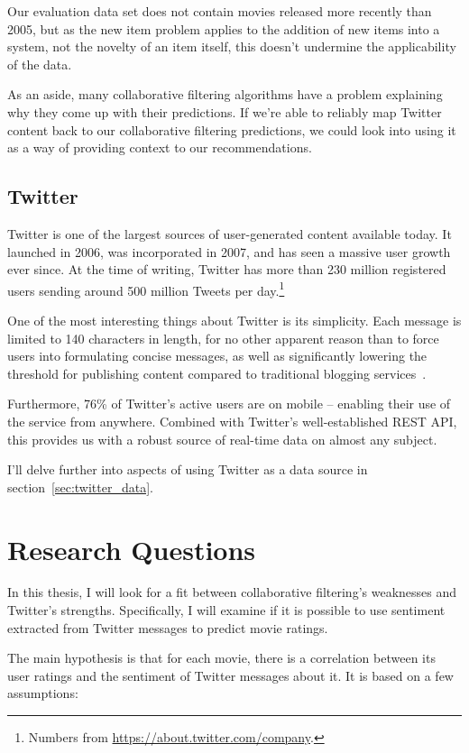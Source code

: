 Our evaluation data set does not contain movies released more recently than 2005, but as the new item problem applies to the addition of new items into a system, not the novelty of an item itself, this doesn't undermine the applicability of the data.

As an aside, many collaborative filtering algorithms have a problem explaining why they come up with their predictions. If we're able to reliably map Twitter content back to our collaborative filtering predictions, we could look into using it as a way of providing context to our recommendations.

\subsection{Twitter}

Twitter is one of the largest sources of user-generated content available today. It launched in 2006, was incorporated in 2007, and has seen a massive user growth ever since. At the time of writing, Twitter has more than 230 million registered users sending around 500 million Tweets per day.\footnote{Numbers from \url{https://about.twitter.com/company}.}

One of the most interesting things about Twitter is its simplicity. Each message is limited to 140 characters in length, for no other apparent reason than to force users into formulating concise messages, as well as significantly lowering the threshold for publishing content compared to traditional blogging services~\cite{Java:2007:WWT:1348549.1348556}.

Furthermore, 76\% of Twitter's active users are on mobile -- enabling their use of the service from anywhere. Combined with Twitter's well-established REST API, this provides us with a robust source of real-time data on almost any subject.

I'll delve further into aspects of using Twitter as a data source in section~\ref{sec:twitter_data}.

\section{Research Questions}

In this thesis, I will look for a fit between collaborative filtering's weaknesses and Twitter's strengths. Specifically, I will examine if it is possible to use sentiment extracted from Twitter messages to predict movie ratings.

The main hypothesis is that for each movie, there is a correlation between its user ratings and the sentiment of Twitter messages about it. It is based on a few assumptions:

